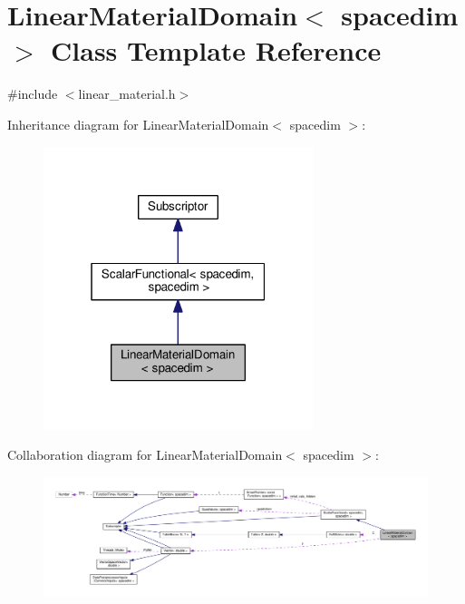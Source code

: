 \hypertarget{class_linear_material_domain}{}\section{Linear\+Material\+Domain$<$ spacedim $>$ Class Template Reference}
\label{class_linear_material_domain}


{\ttfamily \#include $<$linear\+\_\+material.\+h$>$}



Inheritance diagram for Linear\+Material\+Domain$<$ spacedim $>$\+:
\nopagebreak
\begin{figure}[H]
\begin{center}
\leavevmode
\includegraphics[width=223pt]{class_linear_material_domain__inherit__graph}
\end{center}
\end{figure}


Collaboration diagram for Linear\+Material\+Domain$<$ spacedim $>$\+:
\nopagebreak
\begin{figure}[H]
\begin{center}
\leavevmode
\includegraphics[width=350pt]{class_linear_material_domain__coll__graph}
\end{center}
\end{figure}
